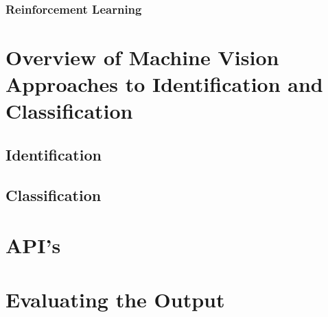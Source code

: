 \subsubsection{Reinforcement Learning}

\section{Overview of Machine Vision Approaches to Identification and Classification}
\subsection{Identification}
\subsection{Classification}

\section{API's}

\section{Evaluating the Output}

